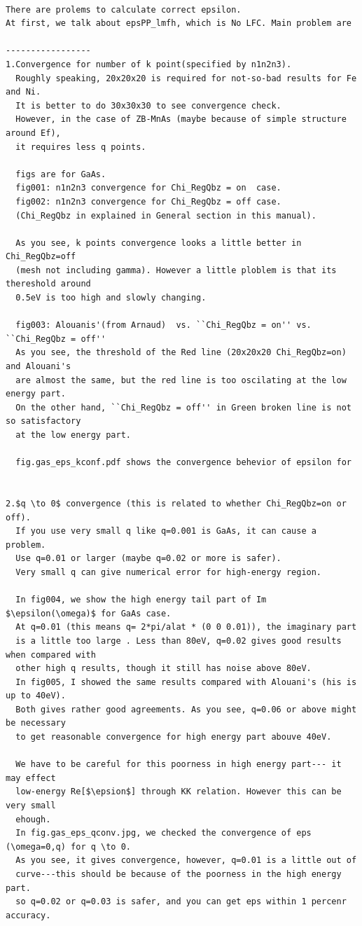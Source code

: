 \begin{verbatim}

There are prolems to calculate correct epsilon.
At first, we talk about epsPP_lmfh, which is No LFC. Main problem are 

-----------------
1.Convergence for number of k point(specified by n1n2n3). 
  Roughly speaking, 20x20x20 is required for not-so-bad results for Fe and Ni.
  It is better to do 30x30x30 to see convergence check.
  However, in the case of ZB-MnAs (maybe because of simple structure around Ef),
  it requires less q points.

  figs are for GaAs.
  fig001: n1n2n3 convergence for Chi_RegQbz = on  case.
  fig002: n1n2n3 convergence for Chi_RegQbz = off case.
  (Chi_RegQbz in explained in General section in this manual).

  As you see, k points convergence looks a little better in Chi_RegQbz=off
  (mesh not including gamma). However a little ploblem is that its thereshold around 
  0.5eV is too high and slowly changing.

  fig003: Alouanis'(from Arnaud)  vs. ``Chi_RegQbz = on'' vs. ``Chi_RegQbz = off''
  As you see, the threshold of the Red line (20x20x20 Chi_RegQbz=on) and Alouani's 
  are almost the same, but the red line is too oscilating at the low energy part.
  On the other hand, ``Chi_RegQbz = off'' in Green broken line is not so satisfactory
  at the low energy part. 

  fig.gas_eps_kconf.pdf shows the convergence behevior of epsilon for 
  
   
2.$q \to 0$ convergence (this is related to whether Chi_RegQbz=on or off).
  If you use very small q like q=0.001 is GaAs, it can cause a problem.
  Use q=0.01 or larger (maybe q=0.02 or more is safer). 
  Very small q can give numerical error for high-energy region.

  In fig004, we show the high energy tail part of Im $\epsilon(\omega)$ for GaAs case.
  At q=0.01 (this means q= 2*pi/alat * (0 0 0.01)), the imaginary part
  is a little too large . Less than 80eV, q=0.02 gives good results when compared with
  other high q results, though it still has noise above 80eV.
  In fig005, I showed the same results compared with Alouani's (his is up to 40eV).
  Both gives rather good agreements. As you see, q=0.06 or above might be necessary
  to get reasonable convergence for high energy part abouve 40eV.

  We have to be careful for this poorness in high energy part--- it may effect
  low-energy Re[$\epsion$] through KK relation. However this can be very small
  ehough.
  In fig.gas_eps_qconv.jpg, we checked the convergence of eps (\omega=0,q) for q \to 0.
  As you see, it gives convergence, however, q=0.01 is a little out of 
  curve---this should be because of the poorness in the high energy part.
  so q=0.02 or q=0.03 is safer, and you can get eps within 1 percenr accuracy.


\end{verbatim}
